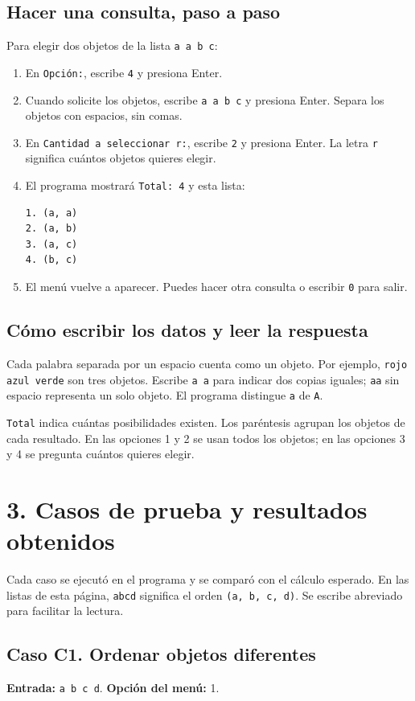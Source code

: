 \documentclass[11pt,a4paper]{article}
\begin{document}
\subsection*{Hacer una consulta, paso a paso}
Para elegir dos objetos de la lista \texttt{a a b c}:
\begin{enumerate}
\item En \texttt{Opción:}, escribe \texttt{4} y presiona Enter.
\item Cuando solicite los objetos, escribe \texttt{a a b c} y presiona Enter.
Separa los objetos con espacios, sin comas.
\item En \texttt{Cantidad a seleccionar r:}, escribe \texttt{2} y presiona Enter.
La letra \texttt{r} significa cuántos objetos quieres elegir.
\item El programa mostrará \texttt{Total: 4} y esta lista:
\begin{verbatim}
1. (a, a)
2. (a, b)
3. (a, c)
4. (b, c)
\end{verbatim}
\item El menú vuelve a aparecer. Puedes hacer otra consulta o escribir
\texttt{0} para salir.
\end{enumerate}

\subsection*{Cómo escribir los datos y leer la respuesta}
Cada palabra separada por un espacio cuenta como un objeto. Por ejemplo,
\texttt{rojo azul verde} son tres objetos. Escribe \texttt{a a} para indicar
dos copias iguales; \texttt{aa} sin espacio representa un solo objeto.
El programa distingue \texttt{a} de \texttt{A}.

\texttt{Total} indica cuántas posibilidades existen. Los paréntesis agrupan
los objetos de cada resultado. En las opciones 1 y 2 se usan todos los
objetos; en las opciones 3 y 4 se pregunta cuántos quieres elegir.

\newpage
\section*{3. Casos de prueba y resultados obtenidos}
Cada caso se ejecutó en el programa y se comparó con el cálculo esperado.
En las listas de esta página, \texttt{abcd} significa el orden
\texttt{(a, b, c, d)}. Se escribe abreviado para facilitar la lectura.

\subsection*{Caso C1. Ordenar objetos diferentes}
\textbf{Entrada:} \texttt{a b c d}. \textbf{Opción del menú:} 1.
\end{document}
